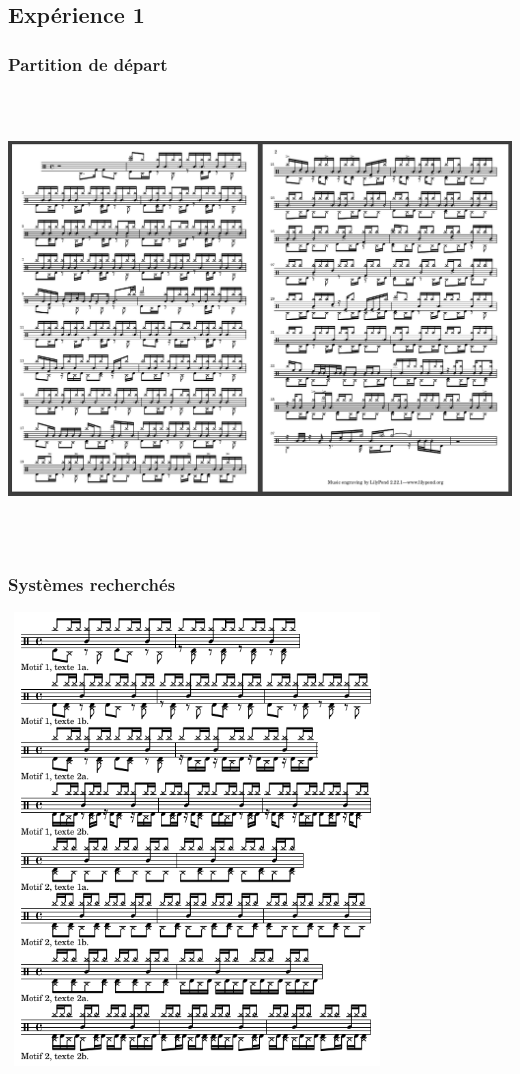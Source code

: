 \subsection{Expérience 1}
\subsubsection{Partition de départ}
\includegraphics[height=120mm, width=160mm]{z_images/3_experimentations/experience_1/partition.png}
\subsubsection{Systèmes recherchés}
\includegraphics[height=120mm, width=100mm]{z_images/3_experimentations/experience_1/systemes_recherches.png}

